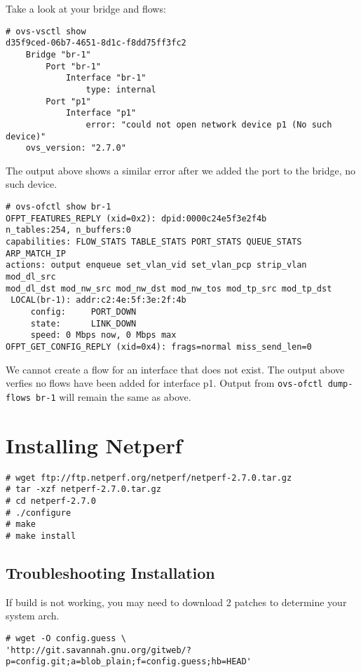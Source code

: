 \documentclass[letter]{article}
\begin{document}
{{\begin{appendices}
{Take a look at your bridge and flows:

\begin{lstlisting}
# ovs-vsctl show
d35f9ced-06b7-4651-8d1c-f8dd75ff3fc2
    Bridge "br-1"
        Port "br-1"
            Interface "br-1"
                type: internal
        Port "p1"
            Interface "p1"
                error: "could not open network device p1 (No such device)"
    ovs_version: "2.7.0"
\end{lstlisting}

The output above shows a similar error after we added the port to the bridge, no such device.

\begin{lstlisting}
# ovs-ofctl show br-1
OFPT_FEATURES_REPLY (xid=0x2): dpid:0000c24e5f3e2f4b
n_tables:254, n_buffers:0
capabilities: FLOW_STATS TABLE_STATS PORT_STATS QUEUE_STATS ARP_MATCH_IP
actions: output enqueue set_vlan_vid set_vlan_pcp strip_vlan mod_dl_src 
mod_dl_dst mod_nw_src mod_nw_dst mod_nw_tos mod_tp_src mod_tp_dst
 LOCAL(br-1): addr:c2:4e:5f:3e:2f:4b
     config:     PORT_DOWN
     state:      LINK_DOWN
     speed: 0 Mbps now, 0 Mbps max
OFPT_GET_CONFIG_REPLY (xid=0x4): frags=normal miss_send_len=0
\end{lstlisting}

We cannot create a flow for an interface that does not exist. The output above verfies no flows have been added for interface p1. Output from \texttt{ovs-ofctl dump-flows br-1} will remain the same as above.

\section{Installing Netperf}
\label{appendix:Netperf}

\begin{lstlisting}
# wget ftp://ftp.netperf.org/netperf/netperf-2.7.0.tar.gz  
# tar -xzf netperf-2.7.0.tar.gz
# cd netperf-2.7.0
# ./configure 
# make 
# make install
\end{lstlisting}

\subsection{Troubleshooting Installation}

If build is not working, you may need to download 2 patches to determine your system arch.

\begin{lstlisting}
# wget -O config.guess \
'http://git.savannah.gnu.org/gitweb/?p=config.git;a=blob_plain;f=config.guess;hb=HEAD' 


\end{lstlisting}}
\end{appendices}}}
\end{document}
